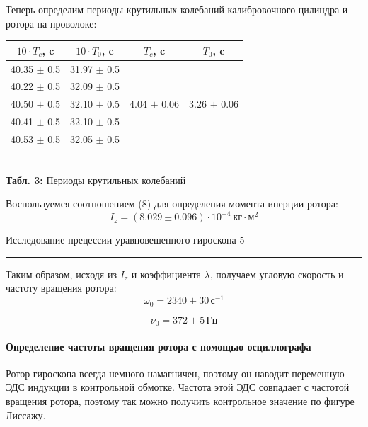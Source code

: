 \documentclass[12pt,a4paper]{scrartcl}
\begin{document}
	Теперь определим периоды крутильных колебаний калибровочного цилиндра и ротора на проволоке:

	\begin{center}
		\begin{tabular}{|c|c|c|c|}
			\hline
			$10 \cdot T_c$, c & $10 \cdot T_0$, c & $T_c$, c & $T_0$, c \\ \hline
			40.35 $\pm$ 0.5 & 31.97 $\pm$ 0.5 & \multirow{5}{*}{4.04 $\pm$ 0.06} & \multirow{5}{*}{3.26 $\pm$ 0.06}   \\ \cline{1-2}
			40.22 $\pm$ 0.5 & 32.09 $\pm$ 0.5 &&    \\ \cline{1-2}
			40.50 $\pm$ 0.5 & 32.10 $\pm$ 0.5 &&    \\ \cline{1-2}
			40.41 $\pm$ 0.5 & 32.10 $\pm$ 0.5 &&    \\ \cline{1-2}
			40.53 $\pm$ 0.5 & 32.05 $\pm$ 0.5 &&    \\ \hline
		\end{tabular}
		\\\textbf{Табл. 3: } Периоды крутильных колебаний
	\end{center}

	Воспользуемся соотношением (8) для определения момента инерции ротора:
	$$I_z = (8.029 \pm 0.096) \cdot 10^{-4}\ \text{кг} \cdot \text{м}^2$$
	
	\newpage
	
	\begin{flushleft}
		\footnotesize{Исследование прецессии уравновешенного гироскопа} \hspace{\fill} \footnotesize{5}
		\\[-0.3cm]\noindent\rule{\textwidth}{0.3pt}
	\end{flushleft}
	
	Таким образом, исходя из $I_z$ и коэффициента $\lambda$, получаем угловую скорость и частоту вращения ротора:
	\begin{equation*}
		\omega_0 = 2340 \pm 30\, \text{с}^{-1}
	\end{equation*}

	\begin{equation*}
		\nu_0 = 372 \pm 5\, \text{Гц}
	\end{equation*}
	
	\paragraph{Определение частоты вращения ротора с помощью осциллографа} \hfill
	
	\par Ротор гироскопа всегда немного намагничен, поэтому он наводит переменную ЭДС индукции в контрольной обмотке. Частота этой ЭДС совпадает с частотой вращения ротора, поэтому так можно получить контрольное значение по фигуре Лиссажу.
	
\end{document}
